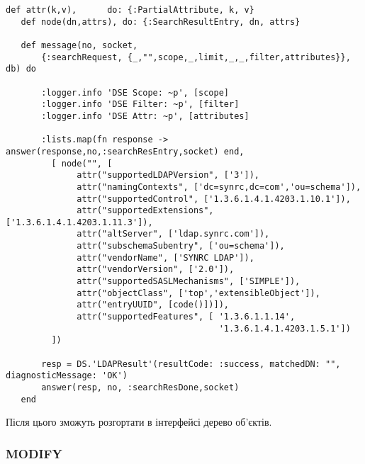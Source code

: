 \begin{lstlisting}
def attr(k,v),      do: {:PartialAttribute, k, v}
   def node(dn,attrs), do: {:SearchResultEntry, dn, attrs}

   def message(no, socket,
       {:searchRequest, {_,"",scope,_,limit,_,_,filter,attributes}}, db) do

       :logger.info 'DSE Scope: ~p', [scope]
       :logger.info 'DSE Filter: ~p', [filter]
       :logger.info 'DSE Attr: ~p', [attributes]

       :lists.map(fn response -> answer(response,no,:searchResEntry,socket) end,
         [ node("", [
              attr("supportedLDAPVersion", ['3']),
              attr("namingContexts", ['dc=synrc,dc=com','ou=schema']),
              attr("supportedControl", ['1.3.6.1.4.1.4203.1.10.1']),
              attr("supportedExtensions", ['1.3.6.1.4.1.4203.1.11.3']),
              attr("altServer", ['ldap.synrc.com']),
              attr("subschemaSubentry", ['ou=schema']),
              attr("vendorName", ['SYNRC LDAP']),
              attr("vendorVersion", ['2.0']),
              attr("supportedSASLMechanisms", ['SIMPLE']),
              attr("objectClass", ['top','extensibleObject']),
              attr("entryUUID", [code()])]),
              attr("supportedFeatures", [ '1.3.6.1.1.14',
                                          '1.3.6.1.4.1.4203.1.5.1'])
         ])

       resp = DS.'LDAPResult'(resultCode: :success, matchedDN: "", diagnosticMessage: 'OK')
       answer(resp, no, :searchResDone,socket)
   end
\end{lstlisting}

Після цього зможуть розгортати в інтерфейсі дерево об'єктів.

\newpage
\subsubsection{MODIFY}

